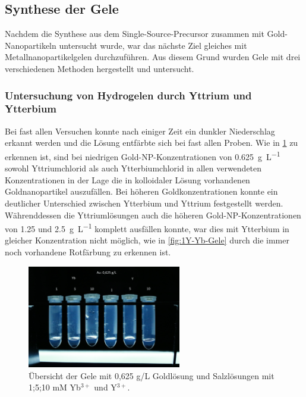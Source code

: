 	
	
	

\subsection{Synthese der Gele}
	
	Nachdem die Synthese aus dem Single-Source-Precursor zusammen mit Gold-Nanopartikeln untersucht wurde, war das nächste Ziel gleiches mit Metallnanopartikelgelen durchzuführen.
	Aus diesem Grund wurden Gele mit drei verschiedenen Methoden hergestellt und untersucht.
	
	\subsubsection{Untersuchung von Hydrogelen durch Yttrium und Ytterbium}
	
		Bei fast allen Versuchen konnte nach einiger Zeit ein dunkler Niederschlag erkannt werden und die Lösung entfärbte sich bei fast allen Proben.
		Wie in \cref{fig:0625Au-Gele} zu erkennen ist, sind bei niedrigen Gold-NP-Konzentrationen von \SI{0,625}{\gram\per\liter} sowohl Yttriumchlorid als auch Ytterbiumchlorid in allen verwendeten Konzentrationen in der Lage die in kolloidaler Lösung vorhandenen Goldnanopartikel auszufällen.
		Bei höheren Goldkonzentrationen konnte ein deutlicher Unterschied zwischen Ytterbium und Yttrium festgestellt werden. 
		Währenddessen die Yttriumlösungen auch die höheren Gold-NP-Konzentrationen von \num{1,25} und \SI{2,5}{\gram\per\liter} komplett ausfällen konnte, war dies mit Ytterbium in gleicher Konzentration nicht möglich, wie in \cref{fig:1Y-Yb-Gele} durch die immer noch vorhandene Rotfärbung zu erkennen ist.
		
		\begin{figure}[H]
			\centering
			\includegraphics[width=0.6\textwidth]{Bilder/0625Au-Gele} 	
			\caption{Übersicht der Gele mit 0,625 g/L Goldlösung und Salzlösungen mit 1;5;10 mM Yb$^{3+}$ und Y$^{3+}$.}
			\label{fig:0625Au-Gele}
		\end{figure}
	
